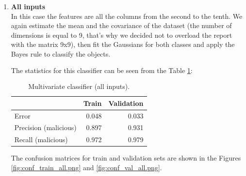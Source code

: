 \documentclass[11pt,a4paper]{article}
\begin{document}
\begin{enumerate}
\begin{enumerate}
		\item \textbf{All inputs} \\
		In this case the features are all the columns from the second to the tenth.
		We again estimate the mean and the covariance of the dataset (the number of dimensions is equal to 9, that's why we decided not to overload the report with the matrix 9x9), then fit the Gaussians for both classes and apply the Bayes rule to classify the objects.
		
		The statistics for this classifier can be seen from the Table \ref{tab:results-all}:
		
		\begin{table}[H]
			\centering
			\begin{tabular}{lrr}
				\toprule
				& \textbf{Train} & \textbf{Validation}  \\ \midrule
				Error & 0.048 & 0.033 \\	
				Precision (malicious) & 0.897 & 0.931 \\
				Recall (malicious) & 0.972 & 0.979 \\
				\bottomrule
			\end{tabular}
			\caption{Multivariate classifier (all inputs).}
			\label{tab:results-all}
		\end{table}
		
		The confusion matrices for train and validation sets are shown in the Figures \ref{fig:conf_train_all.png} and \ref{fig:conf_val_all.png}.
		

\end{enumerate}
\end{enumerate}
\end{document}
